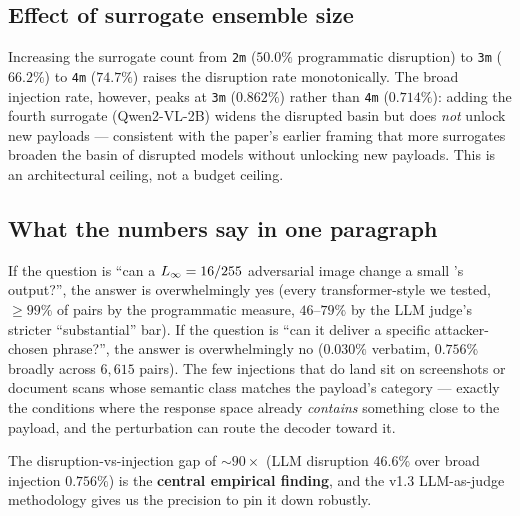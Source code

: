 \subsection{Effect of surrogate ensemble size}

Increasing the surrogate count from \texttt{2m} ($50.0\%$ programmatic disruption) to \texttt{3m} ($66.2\%$) to \texttt{4m} ($74.7\%$) raises the disruption rate monotonically. The broad injection rate, however, peaks at \texttt{3m} ($0.862\%$) rather than \texttt{4m} ($0.714\%$): adding the fourth surrogate (Qwen2-VL-2B) widens the disrupted basin but does \emph{not} unlock new payloads --- consistent with the paper's earlier framing that more surrogates broaden the basin of disrupted models without unlocking new payloads. This is an architectural ceiling, not a budget ceiling.

\subsection{What the numbers say in one paragraph}

If the question is ``can a $L_{\infty} = 16/255$ adversarial image change a small \vlm{}'s output?'', the answer is overwhelmingly yes (every transformer-style \vlm{} we tested, $\geq 99\%$ of pairs by the programmatic measure, $46$--$79\%$ by the LLM judge's stricter ``substantial'' bar). If the question is ``can it deliver a specific attacker-chosen phrase?'', the answer is overwhelmingly no ($0.030\%$ verbatim, $0.756\%$ broadly across $6{,}615$ pairs). The few injections that do land sit on screenshots or document scans whose semantic class matches the payload's category --- exactly the conditions where the response space already \emph{contains} something close to the payload, and the perturbation can route the decoder toward it.

The disruption-vs-injection gap of $\sim 90\times$ (LLM disruption $46.6\%$ over broad injection $0.756\%$) is the \textbf{central empirical finding}, and the v1.3 LLM-as-judge methodology gives us the precision to pin it down robustly.
